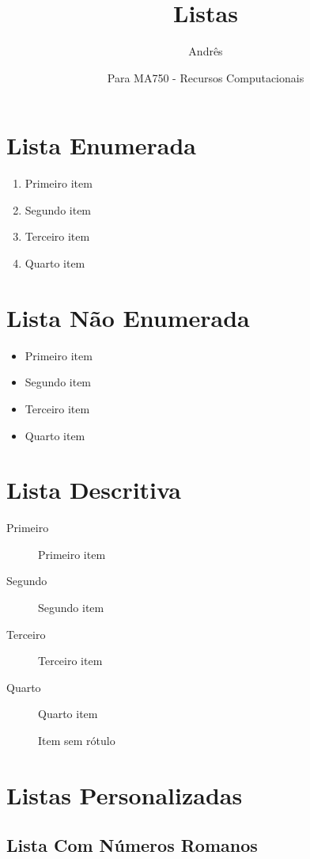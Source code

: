 \documentclass[12pt,a4paper]{article}
\title{Listas}
\author{Andrês}
\date{Para MA750 - Recursos Computacionais}
\begin{document}
\maketitle

\section{Lista Enumerada}

\begin{enumerate}
  \item Primeiro item
  \item Segundo item
  \item Terceiro item
  \item Quarto item
\end{enumerate}

\section{Lista Não Enumerada}

\begin{itemize}
  \item Primeiro item
  \item Segundo item
  \item Terceiro item
  \item Quarto item
\end{itemize}

\section{Lista Descritiva}

\begin{description}
  \item[Primeiro] Primeiro item
  \item[Segundo] Segundo item
  \item[Terceiro] Terceiro item
  \item[Quarto] Quarto item
  \item[] Item sem rótulo
\end{description}

\section{Listas Personalizadas}

\subsection{Lista Com Números Romanos}
\end{document}
